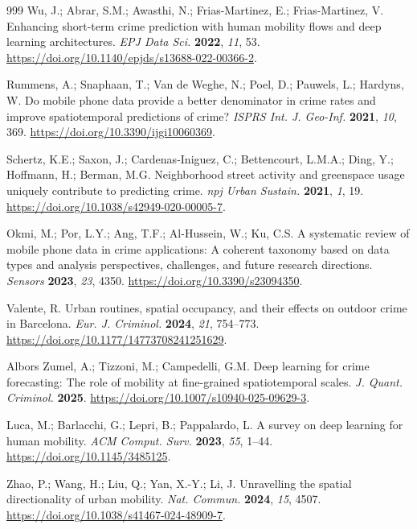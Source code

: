 \begin{thebibliography}{999}
Wu, J.; Abrar, S.M.; Awasthi, N.; Frias-Martinez, E.; Frias-Martinez, V. Enhancing short-term crime prediction with human mobility flows and deep learning architectures. \emph{EPJ Data Sci.} \textbf{2022}, \emph{11}, 53. \url{https://doi.org/10.1140/epjds/s13688-022-00366-2}.

Rummens, A.; Snaphaan, T.; Van de Weghe, N.; Poel, D.; Pauwels, L.; Hardyns, W. Do mobile phone data provide a better denominator in crime rates and improve spatiotemporal predictions of crime? \emph{ISPRS Int. J. Geo-Inf.} \textbf{2021}, \emph{10}, 369. \url{https://doi.org/10.3390/ijgi10060369}.

Schertz, K.E.; Saxon, J.; Cardenas-Iniguez, C.; Bettencourt, L.M.A.; Ding, Y.; Hoffmann, H.; Berman, M.G. Neighborhood street activity and greenspace usage uniquely contribute to predicting crime. \emph{npj Urban Sustain.} \textbf{2021}, \emph{1}, 19. \url{https://doi.org/10.1038/s42949-020-00005-7}.

Okmi, M.; Por, L.Y.; Ang, T.F.; Al-Hussein, W.; Ku, C.S. A systematic review of mobile phone data in crime applications: A coherent taxonomy based on data types and analysis perspectives, challenges, and future research directions. \emph{Sensors} \textbf{2023}, \emph{23}, 4350. \url{https://doi.org/10.3390/s23094350}.

Valente, R. Urban routines, spatial occupancy, and their effects on outdoor crime in Barcelona. \emph{Eur. J. Criminol.} \textbf{2024}, \emph{21}, 754--773. \url{https://doi.org/10.1177/14773708241251629}.

Albors Zumel, A.; Tizzoni, M.; Campedelli, G.M. Deep learning for crime forecasting: The role of mobility at fine-grained spatiotemporal scales. \emph{J. Quant. Criminol.} \textbf{2025}. \url{https://doi.org/10.1007/s10940-025-09629-3}.

Luca, M.; Barlacchi, G.; Lepri, B.; Pappalardo, L. A survey on deep learning for human mobility. \emph{ACM Comput. Surv.} \textbf{2023}, \emph{55}, 1--44. \url{https://doi.org/10.1145/3485125}.

Zhao, P.; Wang, H.; Liu, Q.; Yan, X.-Y.; Li, J. Unravelling the spatial directionality of urban mobility. \emph{Nat. Commun.} \textbf{2024}, \emph{15}, 4507. \url{https://doi.org/10.1038/s41467-024-48909-7}.


\end{thebibliography}
